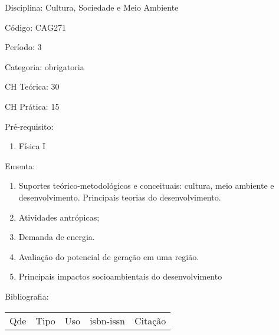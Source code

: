 \documentclass[12pt,a4paper,twoside]{report}
\begin{document}
Disciplina: Cultura, Sociedade e Meio Ambiente

Código: CAG271

Período: 3

Categoria: obrigatoria

CH Teórica: 30

CH Prática: 15




Pré-requisito:
\begin{enumerate}
\item Física I
\end{enumerate}

Ementa:
\begin{enumerate}
\item Suportes teórico-metodológicos e conceituais: cultura, meio ambiente e desenvolvimento. Principais teorias do desenvolvimento.
\item Atividades antrópicas;
\item Demanda de energia.
\item Avaliação do potencial de geração em uma região.
\item Principais impactos socioambientais do desenvolvimento
\end{enumerate}



Bibliografia:


\begin{tabular}{llllp{8cm}}
Qde & Tipo & Uso & isbn-issn & Citação \\
\end{tabular}
\end{document}
